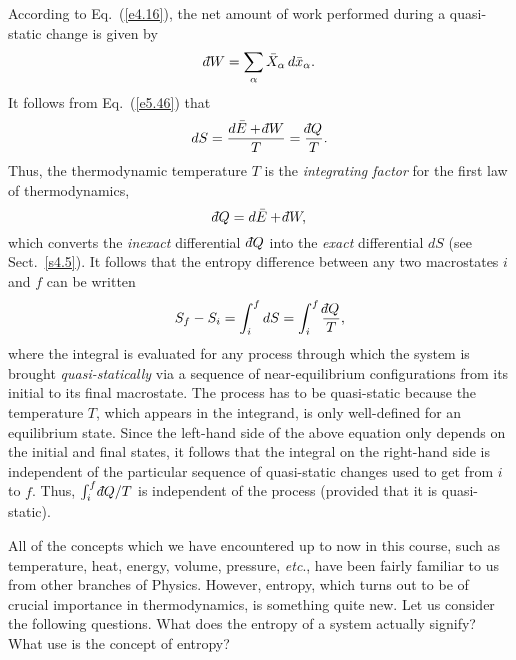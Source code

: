 According to Eq.~(\ref{e4.16}), the net amount of work performed during a quasi-static
change is given by
\begin{equation}
\dbar W = \sum_\alpha \bar{X}_\alpha\,d\bar{x}_\alpha.
\end{equation}
It follows from Eq.~(\ref{e5.46}) that
\begin{equation}
d S = \frac{d\bar{E} +\dbar W}{T} =\frac{ \dbar Q}{T}.
\end{equation}
Thus, the thermodynamic temperature $T$ is the {\em integrating factor}\/ for the
first law of thermodynamics,
\begin{equation}
\dbar Q = d\bar{E} + \dbar W,
\end{equation}
which converts the {\em inexact}\/ differential $\,\dbar Q$ into the {\em exact}\/ 
differential $dS$ (see Sect.~\ref{s4.5}). 
It follows that the entropy difference between any two macrostates
$i$ and $f$  can be written 
\begin{equation}
S_f - S_i = \int_i^f dS = \int_i^f \frac{\dbar Q}{T},
\end{equation}
where the integral is evaluated for any process through which the system is brought
{\em quasi-statically}\/ via  a sequence of near-equilibrium configurations
from its initial to its final macrostate. The process has to  be quasi-static
because the temperature $T$, which appears in the integrand, is only well-defined
for an equilibrium state. Since the left-hand side of the above equation only depends
on the initial and final states, it follows that the integral on the right-hand side
is independent of the particular sequence of quasi-static changes used to get
from $i$ to $f$. Thus, $\int_i^f \dbar Q/T$ is independent of the
process (provided that it is quasi-static).

All of the concepts which we have encountered up to now in this course, such
as temperature, heat, energy, volume, pressure, {\em etc}., have been fairly
 familiar to us
from  other branches of Physics.
However, entropy, which turns out to be of crucial importance
in thermodynamics, is something quite new. Let us consider the following
questions. What does the  entropy of a system actually signify? What use is
the concept of  entropy?
 
